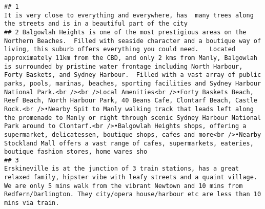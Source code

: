 \documentclass[
]{article}
\begin{document}
\begin{verbatim}
## 1                                                                                                                                                                                                                                                                                                                                                                                                                                                                                                                                                                                                                                                                                                                                                                                                                                                                                                                  It is very close to everything and everywhere, has  many trees along the streets and is in a beautiful part of the city
## 2 Balgowlah Heights is one of the most prestigious areas on the Northern Beaches.  Filled with seaside character and a boutique way of living, this suburb offers everything you could need.   Located approximately 11km from the CBD, and only 2 kms from Manly, Balgowlah is surrounded by pristine water frontage including North Harbour, Forty Baskets, and Sydney Harbour.  Filled with a vast array of public parks, pools, marinas, beaches, sporting facilities and Sydney Harbour National Park.<br /><br />Local Amenities<br />•Forty Baskets Beach, Reef Beach, North Harbour Park, 40 Beans Cafe, Clontarf Beach, Castle Rock.<br />•Nearby Spit to Manly walking track that leads left along the promenade to Manly or right through scenic Sydney Harbour National Park around to Clontarf.<br />•Balgowlah Heights shops, offering a supermarket, delicatessen, boutique shops, cafes and more<br />•Nearby Stockland Mall offers a vast range of cafes, supermarkets, eateries, boutique fashion stores, home wares sho
## 3                                                                                                                                                                                                                                                                                                                                                                                                                                                                                                                                                                                                                                                                                                                                          Erskineville is at the junction of 3 train stations, has a great relaxed family, hipster vibe with leafy streets and a quaint village. We are only 5 mins walk from the vibrant Newtown and 10 mins from Redfern/Darlington. They city/opera house/harbour etc are less than 10 mins via train.

\end{verbatim}
\end{document}
